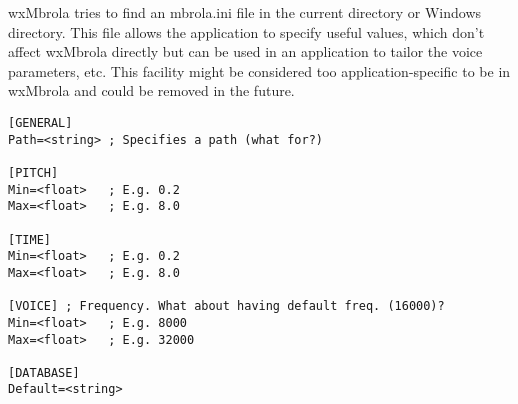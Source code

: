 
wxMbrola tries to find an mbrola.ini file in the current directory or Windows directory.
This file allows the application to specify useful values, which don't affect wxMbrola
directly but can be used in an application to tailor the voice parameters, etc. This
facility might be considered too application-specific to be in wxMbrola and could be
removed in the future.

\begin{verbatim}
[GENERAL]
Path=<string> ; Specifies a path (what for?)

[PITCH]
Min=<float>   ; E.g. 0.2
Max=<float>   ; E.g. 8.0

[TIME]
Min=<float>   ; E.g. 0.2
Max=<float>   ; E.g. 8.0

[VOICE] ; Frequency. What about having default freq. (16000)?
Min=<float>   ; E.g. 8000
Max=<float>   ; E.g. 32000

[DATABASE]
Default=<string>

\end{verbatim}

